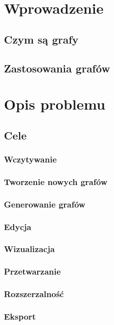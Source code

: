 \documentclass[a4paper,12pt]{report}
\begin{document}



\tableofcontents

\chapter{Wprowadzenie}
\section{Czym są grafy}
\section{Zastosowania grafów}

\chapter{Opis problemu}
\section{Cele}
\subsection{Wczytywanie}
\subsection{Tworzenie nowych grafów}
\subsection{Generowanie grafów}
\subsection{Edycja}
\subsection{Wizualizacja}
\subsection{Przetwarzanie}
\subsection{Rozszerzalność}
\subsection{Eksport}
\end{document}
